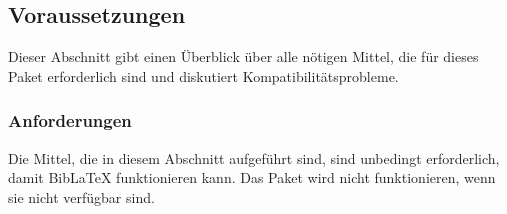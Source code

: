 \documentclass{ltxdockit}[2011/03/25]
\newcommand*{\biblatex}{BibLaTeX\xspace}
\begin{document}
\subsection{Voraussetzungen} \label{int:pre}

Dieser Abschnitt gibt einen Überblick über alle nötigen Mittel, die für dieses
Paket erforderlich sind und diskutiert Kompatibilitätsprobleme. 

\subsubsection{Anforderungen} \label{int:pre:req}

Die Mittel, die in diesem Abschnitt aufgeführt sind, sind unbedingt
erforderlich, damit \biblatex funktionieren kann. Das Paket wird nicht
funktionieren, wenn sie nicht verfügbar sind. 
\end{document}
